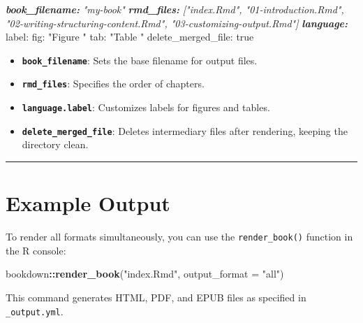 \documentclass[
]{book}
\newenvironment{Shaded}{\begin{snugshade}}{\end{snugshade}}
\newcommand{\AnnotationTok}[1]{\textcolor[rgb]{0.56,0.35,0.01}{\textbf{\textit{#1}}}}
\newcommand{\AttributeTok}[1]{\textcolor[rgb]{0.13,0.29,0.53}{#1}}
\newcommand{\CommentTok}[1]{\textcolor[rgb]{0.56,0.35,0.01}{\textit{#1}}}
\newcommand{\FunctionTok}[1]{\textcolor[rgb]{0.13,0.29,0.53}{\textbf{#1}}}
\newcommand{\NormalTok}[1]{#1}
\newcommand{\SpecialCharTok}[1]{\textcolor[rgb]{0.81,0.36,0.00}{\textbf{#1}}}
\newcommand{\StringTok}[1]{\textcolor[rgb]{0.31,0.60,0.02}{#1}}
\providecommand{\tightlist}{%
  \setlength{\itemsep}{0pt}\setlength{\parskip}{0pt}}
\theoremstyle{definition}
\theoremstyle{definition}
\theoremstyle{definition}
\theoremstyle{definition}
\theoremstyle{remark}
\begin{document}
\begin{Shaded}
\begin{Highlighting}[]
\AnnotationTok{book\_filename:}\CommentTok{ "my{-}book"}
\AnnotationTok{rmd\_files:}\CommentTok{ ["index.Rmd", "01{-}introduction.Rmd", "02{-}writing{-}structuring{-}content.Rmd", "03{-}customizing{-}output.Rmd"]}
\AnnotationTok{language:}
\NormalTok{  label:}
\NormalTok{    fig: "Figure "}
\NormalTok{    tab: "Table "}
\NormalTok{delete\_merged\_file: true}
\end{Highlighting}
\end{Shaded}

\begin{itemize}
\tightlist
\item
  \textbf{\texttt{book\_filename}}: Sets the base filename for output files.
\item
  \textbf{\texttt{rmd\_files}}: Specifies the order of chapters.
\item
  \textbf{\texttt{language.label}}: Customizes labels for figures and tables.
\item
  \textbf{\texttt{delete\_merged\_file}}: Deletes intermediary files after rendering, keeping the directory clean.
\end{itemize}

\begin{center}\rule{0.5\linewidth}{0.5pt}\end{center}

\section{Example Output}\label{example-output}

To render all formats simultaneously, you can use the \texttt{render\_book()} function in the R console:

\begin{Shaded}
\begin{Highlighting}[]
\NormalTok{bookdown}\SpecialCharTok{::}\FunctionTok{render\_book}\NormalTok{(}\StringTok{"index.Rmd"}\NormalTok{, }\AttributeTok{output\_format =} \StringTok{"all"}\NormalTok{)}
\end{Highlighting}
\end{Shaded}

This command generates HTML, PDF, and EPUB files as specified in \texttt{\_output.yml}.
\end{document}

